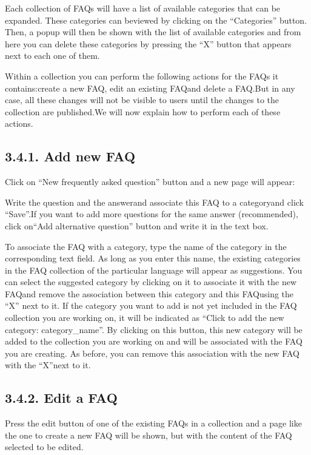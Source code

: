 \documentclass[letterpaper,10pt,english]{sphinxmanual}
\begin{document}
Each collection of FAQs will have a list of available categories that can be expanded. These categories can beviewed by clicking on the “Categories” button.
Then, a popup will then be shown with the list of available categories and from here you can delete these categories by pressing the “X” button that appears next to each one of them.

Within a collection you can perform the following actions for the FAQs it contains:create a new FAQ, edit an existing FAQand delete a FAQ.But in any case, all these changes will not be visible to users until the changes to the collection are published.We will now explain how to perform each of these actions.


\subsection{3.4.1. Add new FAQ}
\label{\detokenize{pages/Superadmin profile:add-new-faq}}
Click on “New frequently asked question” button and a new page will appear:



Write the question and the answerand associate this FAQ to a categoryand click “Save”.If you want to add more questions for the same answer (recommended), click on“Add alternative question” button and write it in the text box.

To  associate  the  FAQ  with  a  category,  type  the name  of  the  category  in  the corresponding text field. As long as you enter this name, the existing categories in the FAQ collection of the particular language will appear as suggestions.
You can select the suggested category by clicking on it to associate it with the new FAQand remove the association between this category and this FAQusing the “X” next to it.
If the category you want to add is not yet included in the FAQ collection you are working on, it will be indicated as “Click to add the new category: category\_name”. By clicking on this button, this new category will be added to the collection you are working on and will be associated with the FAQ you are creating. As before, you can remove this association with the new FAQ with the “X”next to it.


\subsection{3.4.2. Edit a FAQ}
\label{\detokenize{pages/Superadmin profile:edit-a-faq}}
Press the edit button of one of the existing FAQs in a collection and a page like the one to create a new FAQ will be shown, but with the content of the FAQ selected to be edited.
\end{document}
